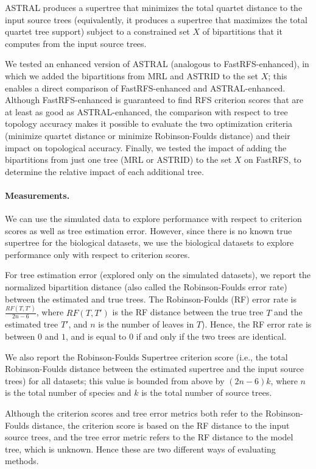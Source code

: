 ASTRAL produces a supertree  that minimizes the total quartet distance
to the input source trees (equivalently, it produces a supertree that
maximizes the total quartet tree support) subject to a constrained
set $X$ of bipartitions that it computes from the input source
trees.

We tested an enhanced version of
ASTRAL (analogous to FastRFS-enhanced), in which 
we added the bipartitions from MRL and ASTRID 
to the set $X$; this enables a direct comparison of
FastRFS-enhanced and ASTRAL-enhanced. Although
FastRFS-enhanced is guaranteed to find RFS criterion scores
that are at least as good as
ASTRAL-enhanced, the comparison with respect to tree topology accuracy
makes it possible to evaluate the two optimization
criteria (minimize quartet distance or
minimize Robinson-Foulds distance) and their impact on topological accuracy.
Finally, we tested the impact of adding the bipartitions
from just one tree (MRL or ASTRID) to
the set $X$ on FastRFS, to determine the relative impact
of each additional tree.


\paragraph{\bf Measurements. }
We can use the simulated data to explore performance with respect to
criterion scores as well as tree estimation error. 
However, 
since there is no known true
supertree for the biological datasets, we use the biological 
datasets to explore performance only with respect to criterion scores.

For tree estimation error (explored only on the simulated
datasets), we
report the normalized bipartition distance (also
called the Robinson-Foulds error rate) between the
estimated and true trees.
The
Robinson-Foulds  (RF) error rate is
 $\frac{RF(T,T')}{2n-6}$, where $RF(T,T')$ is the RF distance between the true tree $T$ and the estimated tree $T'$, and $n$ is the number of leaves in $T$). 
Hence, the RF error rate is  between $0$ and $1$, and is equal to $0$ if and only if the two trees are identical. 

We also report the Robinson-Foulds Supertree criterion
score (i.e., the total Robinson-Foulds distance between the
estimated supertree
and the input source trees) for all datasets;
this value is bounded from
above by $(2n-6)k$, where $n$ is the total number of species and $k$ is the total number of source trees.

Although the criterion scores and tree error metrics both refer
to the Robinson-Foulds distance, the criterion score is based
on the RF distance to the input source trees, and the
tree error metric refers to the RF distance to the model  tree, which is unknown.
Hence these are two different ways of evaluating  methods.


